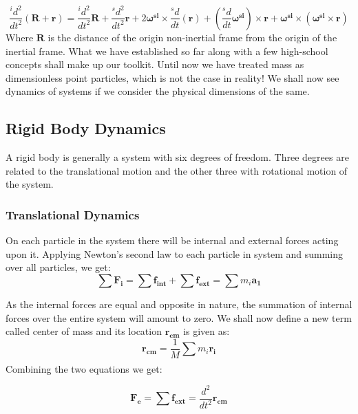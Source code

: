 \documentclass[12pt, letterpaper]{article}
\begin{document}
\begin{displaymath}
\frac{{}^id^2}{dt^2}(\mathbf{R + r}) = \frac{{}^id^2}{dt^2}\mathbf{R} + \frac{{}^sd^2}{dt^2}\mathbf{r} + 2\mathbf{\omega^{si}}\times\frac{{}^sd}{dt}(\textbf{r}) + (\frac{{}^sd}{dt}\mathbf{\omega^{si}})\times\mathbf{r} + \mathbf{\omega^{si}}\times(\mathbf{\omega^{si}}\times\mathbf{r})
\end{displaymath}
Where $\mathbf{R}$ is the distance of the origin non-inertial frame from the origin of the inertial frame. What we have established so far along with a few high-school concepts shall make up our toolkit. Until now we have treated mass as dimensionless point particles, which is not the case in reality! We shall now see dynamics of systems if we consider the physical dimensions of the same.

\subsection{Rigid Body Dynamics}

A rigid body is generally a system with six degrees of freedom. Three degrees are related to the translational motion and the other three with rotational motion of the system. 

\subsubsection{Translational Dynamics}

On each particle in the system there will be internal and external forces acting upon it. Applying Newton's second law to each particle in system and summing over all particles, we get:
\begin{displaymath}
\sum \mathbf{F_i} = \sum \mathbf{f_{int}} + \sum \mathbf{f_{ext}} = \sum m_i\mathbf{a_1}
\end{displaymath}


As the internal forces are equal and opposite in nature, the summation of internal forces over the entire system will amount to zero. We shall now define a new term called center of mass and its location $\mathbf{r_{cm}}$ is given as:
\begin{displaymath}
\mathbf{r_{cm}} = \frac{1}{M}\sum_{}^{} m_{i} \mathbf{r_{i}}
\end{displaymath}
 Combining the two equations we get:

 \begin{displaymath}
 \mathbf{F_e} = \sum \mathbf{f_{ext}} = \frac{d^2}{dt^2}\mathbf{r_{cm}}
 \end{displaymath}
\end{document}
